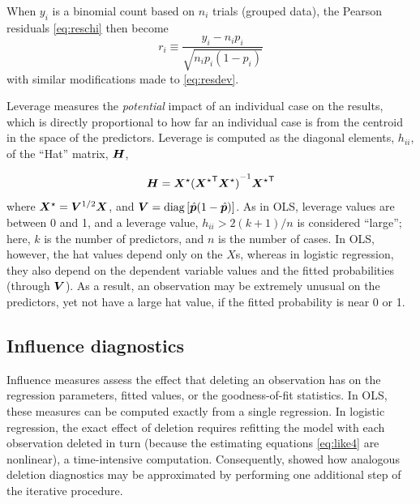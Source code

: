 When $y_i$ is a binomial count based on $n_i$ trials (grouped data),
the Pearson residuals \eqref{eq:reschi} then become
\begin{equation*}%
r_i \equiv \frac{y_i -n_i p_i}{\sqrt{n_i  p_i  (1-p_i)}}
\end{equation*}
with similar modifications made to \eqref{eq:resdev}.

Leverage measures the \emph{potential} impact of an individual case
on the results, which is directly proportional to how far an
individual case is from the centroid in the space of the
predictors.  Leverage is computed as the diagonal elements,
\(h_{ii}\), of the ``Hat'' matrix, \(\bm{H}\),

\begin{equation*}%
\mat{H} = {\mat{X}}^\star
{( {\mat{X}^\star}\trans {\mat{X}}^\star )}^{-1} {\mat{X}^\star}\trans
\end{equation*}
where \({\bm{X}} ^\star = {\bm{V}}^{1/2} \bm{X}\), and \(\bm{V}  =
\mathrm{diag}\, [ \hat{\bm{p}} ( 1 - \hat{\bm{p}})] \).  As in OLS,
leverage values are between 0 and 1, and a leverage value,
\(h_{ii}  > 2 (k+1) /  n\) is considered ``large''; here, \(k\) is the
number of predictors, and \(n\) is the number of cases.
In OLS, however, the hat values depend only on the $X$s, whereas
in logistic regression, they also depend on the dependent
variable values and the fitted probabilities (through $\bm{V}$).
As a result, an observation may be extremely unusual on the predictors,
yet not have a large hat value, if the fitted probability is near 0 or 1.

\subsection{Influence diagnostics}\label{sec:logist-infldiag}
Influence measures assess the effect that deleting an
observation has on the regression parameters, fitted values, or the
goodness-of-fit statistics.  In OLS, these measures
can be computed exactly from a single regression.
In logistic regression, the exact effect of deletion
requires refitting the model with each observation deleted in turn
(because the estimating equations \eqref{eq:like4} are nonlinear),
a time-intensive computation.
Consequently, \citet{Pregibon:81} showed how analogous deletion
diagnostics may be approximated by performing one additional step
of the iterative procedure.

